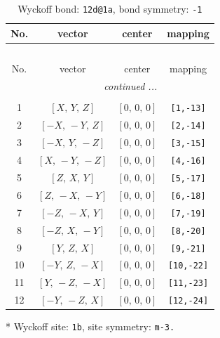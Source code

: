 \documentclass[fleqn,8pt]{jsarticle}
\begin{document}
\begin{longtable}{cccc}
\caption{Wyckoff bond: {\tt 12d@1a}, bond symmetry: {\tt -1}}
 \\
 \hline \hline
No. & vector & center & mapping \\ \hline \endfirsthead

\multicolumn{3}{l}{\tablename\ \thetable{}} \\
 \hline \hline
No. & vector & center & mapping \\ \hline \endhead

 \hline \hline
\multicolumn{3}{r}{\footnotesize\it continued ...} \\ \endfoot

 \hline \hline
\multicolumn{3}{r}{} \\ \endlastfoot

1 & $\left[ X,\, Y,\, Z \right]$ & $\left[ 0,\, 0,\, 0 \right]$ & {\tt [1,-13]} \\ \hline
2 & $\left[ - X,\, - Y,\, Z \right]$ & $\left[ 0,\, 0,\, 0 \right]$ & {\tt [2,-14]} \\ \hline
3 & $\left[ - X,\, Y,\, - Z \right]$ & $\left[ 0,\, 0,\, 0 \right]$ & {\tt [3,-15]} \\ \hline
4 & $\left[ X,\, - Y,\, - Z \right]$ & $\left[ 0,\, 0,\, 0 \right]$ & {\tt [4,-16]} \\ \hline
5 & $\left[ Z,\, X,\, Y \right]$ & $\left[ 0,\, 0,\, 0 \right]$ & {\tt [5,-17]} \\ \hline
6 & $\left[ Z,\, - X,\, - Y \right]$ & $\left[ 0,\, 0,\, 0 \right]$ & {\tt [6,-18]} \\ \hline
7 & $\left[ - Z,\, - X,\, Y \right]$ & $\left[ 0,\, 0,\, 0 \right]$ & {\tt [7,-19]} \\ \hline
8 & $\left[ - Z,\, X,\, - Y \right]$ & $\left[ 0,\, 0,\, 0 \right]$ & {\tt [8,-20]} \\ \hline
9 & $\left[ Y,\, Z,\, X \right]$ & $\left[ 0,\, 0,\, 0 \right]$ & {\tt [9,-21]} \\ \hline
10 & $\left[ - Y,\, Z,\, - X \right]$ & $\left[ 0,\, 0,\, 0 \right]$ & {\tt [10,-22]} \\ \hline
11 & $\left[ Y,\, - Z,\, - X \right]$ & $\left[ 0,\, 0,\, 0 \right]$ & {\tt [11,-23]} \\ \hline
12 & $\left[ - Y,\, - Z,\, X \right]$ & $\left[ 0,\, 0,\, 0 \right]$ & {\tt [12,-24]} \\
\end{longtable}
* Wyckoff site: {\tt 1b}, site symmetry: {\tt m-3.}
\renewcommand{\arraystretch}{1.2}
\end{document}
